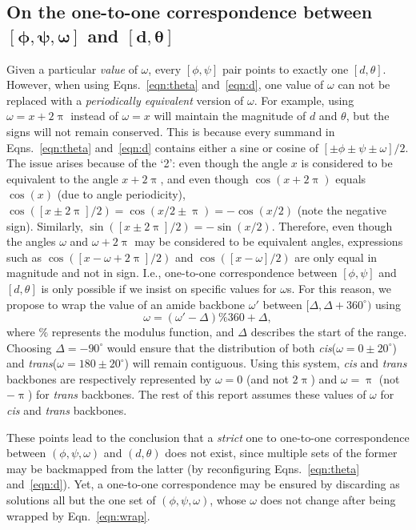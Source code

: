 \documentclass[fleqn,10pt,lineno]{wlpeerj} %
\newcommand{\n}[1]{{\color{blue}#1}}
\newcommand{\Eqn}[1]{Eqn.~\ref{#1}}
\newcommand{\Eqns}[1]{Eqns.~\ref{#1}}
\newcommand{\cis}{{\em cis}\xspace}
\newcommand{\trans}{{\em trans}\xspace}
\begin{document}
\subsection*{\n{On the one-to-one correspondence between $\bm{[\phi,\psi,\omega]}$ and $\bm{[d,\theta]}$}}
\n{Given a particular {\it value} of $\omega$, every $[\phi,\psi]$ pair points to exactly one $[d,\theta]$. However, when using \Eqns{eqn:theta} and~\ref{eqn:d}, one value of $\omega$ can not be replaced with a {\em periodically equivalent} version of $\omega$. For example, using $\omega=x+2\uppi$ instead of $\omega=x$ will maintain the magnitude of $d$ and $\theta$, but the signs will not remain conserved. This is because every summand in \Eqns{eqn:theta} and~\ref{eqn:d} contains either a sine or cosine of $[\pm\phi \pm\psi \pm\omega]/2$. The issue arises because of the `2': even though the angle $x$ is considered to be equivalent to the angle $x+2\uppi$, and even though $\cos(x+2\uppi)$ equals $\cos(x)$ (due to angle periodicity), $\cos([x \pm 2\uppi]/2) = \cos(x/2 \pm \uppi) = -\cos(x/2)$ (note the negative sign). Similarly, $\sin([x \pm 2\uppi]/2) = -\sin(x/2)$. Therefore, even though the angles $\omega$ and $\omega+2\uppi$ may be considered to be equivalent angles, expressions such as $\cos([x-\omega + 2\uppi]/2)$ and $\cos([x-\omega]/2)$ are only equal in magnitude and not in sign. I.e., one-to-one correspondence between $[\phi,\psi]$ and $[d,\theta]$ is only possible if we insist on specific values for $\omega$s. For this reason, we propose to wrap the value of an amide backbone  $\omega'$ between $[\Delta,\Delta+360^\circ)$ using 
\begin{equation}
\label{eqn:wrap}
\omega = ( \omega' - \Delta ) \% 360 + \Delta,
\end{equation}
where $\%$ represents the modulus function, and $\Delta$ describes the start of the range. Choosing $\Delta=-90^\circ$ would ensure that the distribution of both \cis ($\omega = 0 \pm 20^\circ$) and \trans ($\omega = 180\pm 20^\circ$)  will remain contiguous. %
Using this system, \cis and \trans backbones are respectively represented by $\omega=0$ (and not $2\uppi$) and $\omega=\uppi$ (not $-\uppi$) for \trans backbones. The rest of this report assumes these values of $\omega$ for \cis and \trans backbones.

These points lead to the conclusion that a {\em strict} one to one-to-one correspondence between $(\phi,\psi,\omega)$ and $(d,\theta)$ does not exist, since multiple sets of the former may be backmapped from the latter (by reconfiguring \Eqns{eqn:theta} and~\ref{eqn:d}). Yet, a one-to-one correspondence may be ensured by discarding as solutions all but the one set of $(\phi,\psi,\omega)$, whose $\omega$ does not change after being wrapped by \Eqn{eqn:wrap}.}
\end{document}
